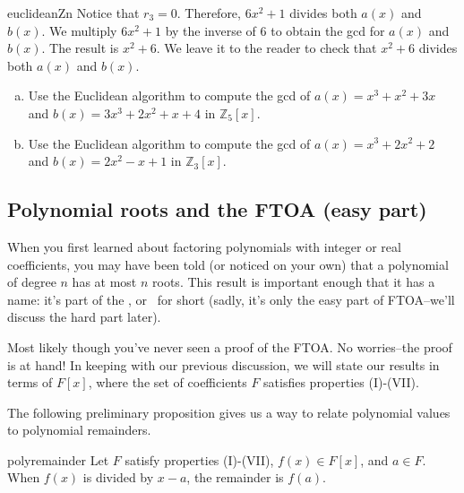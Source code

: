\begin{example}{euclideanZn}
Notice that $r_3=0$. Therefore, $6x^2 + 1$ divides both $a(x)$ and $b(x)$. We multiply $6x^2 + 1$ by the inverse of 6 to obtain the gcd for $a(x)$ and $b(x)$. The result is $x^2+6$. We leave it to the reader to check that $x^2+6$ divides both $a(x)$ and $b(x)$.
\end{example}

\begin{exercise}{}
\begin{enumerate}[(a)]
\item
Use the Euclidean algorithm to compute the gcd of $a(x)=x^3+x^2+3x$ and  $b(x)=3x^3+2x^2+x+4$ in $\mathbb{Z}_5[x]$.
\item
Use the Euclidean algorithm to compute the gcd of $a(x)=x^3+2x^2+2$ and  $b(x)=2x^2-x+1$ in $\mathbb{Z}_3[x]$. 
\end{enumerate}
\end{exercise}

\subsection{Polynomial roots and the FTOA (easy part) \quad                                      
{}}\label{subsec:Polynomials:PolynomialsAndDivision:FTOA}


When you first learned about factoring polynomials with integer or real coefficients, you may have been told (or  noticed on your own) that a polynomial of degree $n$ has at most $n$ roots. This result is important enough that it has a name: it's part of the , or \ for short (sadly, it's only the easy part of FTOA--we'll discuss the hard part later). 

 Most likely though you've never seen a proof of the FTOA. No worries--the proof is at hand!   In keeping with our previous discussion, we will state our results in terms of $F[x]$, where the set of coefficients $F$ satisfies properties (I)-(VII).


The following preliminary proposition gives us a way to relate polynomial values to polynomial remainders.

\begin{prop}{polyremainder}
Let $F$ satisfy properties (I)-(VII), $f(x) \in F[x]$, and $a \in F$. When $f(x)$ is divided by $x-a$, the remainder is $f(a)$.
\end {prop}

